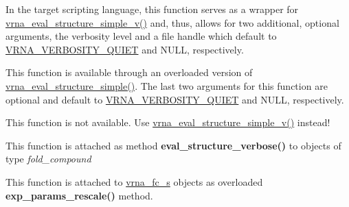 \begin{DoxyRefList}
\item[\label{wrappers__wrappers000035}%
\Hypertarget{wrappers__wrappers000035}%
Global \mbox{\hyperlink{group__eval_ga7e5273464b775d4130245681312c1369}{vrna\+\_\+eval\+\_\+structure\+\_\+simple}} (const char $\ast$string, const char $\ast$structure)]In the target scripting language, this function serves as a wrapper for \mbox{\hyperlink{group__eval_gacd6278343e77d13f1d53588e50d303bc}{vrna\+\_\+eval\+\_\+structure\+\_\+simple\+\_\+v()}} and, thus, allows for two additional, optional arguments, the verbosity level and a file handle which default to \mbox{\hyperlink{eval_8h_af4afe19780b61b4962c613bde324128b}{V\+R\+N\+A\+\_\+\+V\+E\+R\+B\+O\+S\+I\+T\+Y\+\_\+\+Q\+U\+I\+ET}} and N\+U\+LL, respectively.  
\item[\label{wrappers__wrappers000045}%
\Hypertarget{wrappers__wrappers000045}%
Global \mbox{\hyperlink{group__eval_gacd6278343e77d13f1d53588e50d303bc}{vrna\+\_\+eval\+\_\+structure\+\_\+simple\+\_\+v}} (const char $\ast$string, const char $\ast$structure, int verbosity\+\_\+level, F\+I\+LE $\ast$file)]This function is available through an overloaded version of \mbox{\hyperlink{group__eval_ga7e5273464b775d4130245681312c1369}{vrna\+\_\+eval\+\_\+structure\+\_\+simple()}}. The last two arguments for this function are optional and default to \mbox{\hyperlink{eval_8h_af4afe19780b61b4962c613bde324128b}{V\+R\+N\+A\+\_\+\+V\+E\+R\+B\+O\+S\+I\+T\+Y\+\_\+\+Q\+U\+I\+ET}} and N\+U\+LL, respectively.  
\item[\label{wrappers__wrappers000043}%
\Hypertarget{wrappers__wrappers000043}%
Global \mbox{\hyperlink{group__eval_gaf928bfd96767e1b8033a95a4cc432e39}{vrna\+\_\+eval\+\_\+structure\+\_\+simple\+\_\+verbose}} (const char $\ast$string, const char $\ast$structure, F\+I\+LE $\ast$file)]This function is not available. Use \mbox{\hyperlink{group__eval_gacd6278343e77d13f1d53588e50d303bc}{vrna\+\_\+eval\+\_\+structure\+\_\+simple\+\_\+v()}} instead!  
\item[\label{wrappers__wrappers000027}%
\Hypertarget{wrappers__wrappers000027}%
Global \mbox{\hyperlink{group__eval_ga0928d699d310178f84ee2351034e5cb5}{vrna\+\_\+eval\+\_\+structure\+\_\+verbose}} (vrna\+\_\+fold\+\_\+compound\+\_\+t $\ast$vc, const char $\ast$structure, F\+I\+LE $\ast$file)]This function is attached as method {\bfseries eval\+\_\+structure\+\_\+verbose()} to objects of type {\itshape fold\+\_\+compound}  
\item[\label{wrappers__wrappers000080}%
\Hypertarget{wrappers__wrappers000080}%
Global \mbox{\hyperlink{group__energy__parameters_gad607bc3a5b5da16400e2ca4ea5560233}{vrna\+\_\+exp\+\_\+params\+\_\+rescale}} (vrna\+\_\+fold\+\_\+compound\+\_\+t $\ast$vc, double $\ast$mfe)]This function is attached to \mbox{\hyperlink{group__fold__compound_structvrna__fc__s}{vrna\+\_\+fc\+\_\+s}} objects as overloaded {\bfseries exp\+\_\+params\+\_\+rescale()} method.


\end{DoxyRefList}
